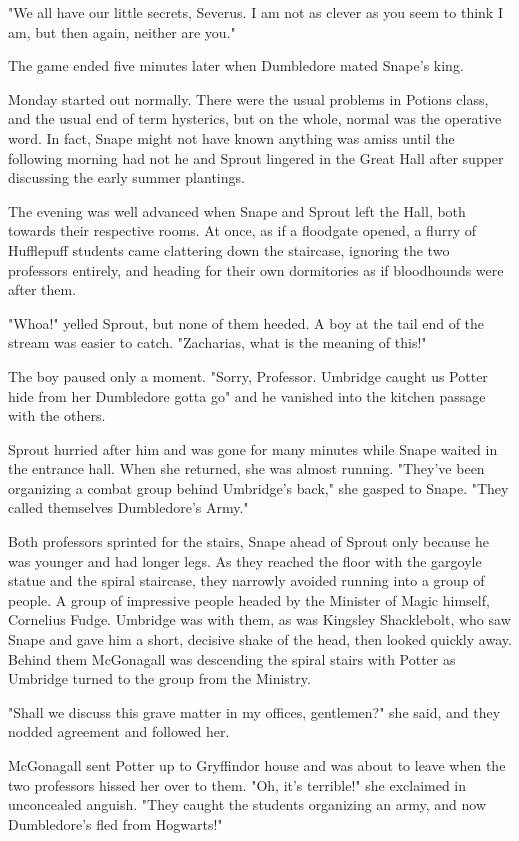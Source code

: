 "We all have our little secrets, Severus. I am not as clever as you seem to think I am, but then again, neither are you."

The game ended five minutes later when Dumbledore mated Snape's king.

Monday started out normally. There were the usual problems in Potions class, and the usual end of term hysterics, but on the whole, normal was the operative word. In fact, Snape might not have known anything was amiss until the following morning had not he and Sprout lingered in the Great Hall after supper discussing the early summer plantings.

The evening was well advanced when Snape and Sprout left the Hall, both towards their respective rooms. At once, as if a floodgate opened, a flurry of Hufflepuff students came clattering down the staircase, ignoring the two professors entirely, and heading for their own dormitories as if bloodhounds were after them.

"Whoa!" yelled Sprout, but none of them heeded. A boy at the tail end of the stream was easier to catch. "Zacharias, what is the meaning of this!"

The boy paused only a moment. "Sorry, Professor. Umbridge{\el} caught us{\el} Potter{\el} hide from her{\el} Dumbledore{\el} gotta go{\el}" and he vanished into the kitchen passage with the others.

Sprout hurried after him and was gone for many minutes while Snape waited in the entrance hall. When she returned, she was almost running. "They've been organizing a combat group behind Umbridge's back," she gasped to Snape. "They called themselves Dumbledore's Army."

Both professors sprinted for the stairs, Snape ahead of Sprout only because he was younger and had longer legs. As they reached the floor with the gargoyle statue and the spiral staircase, they narrowly avoided running into a group of people. A group of impressive people headed by the Minister of Magic himself, Cornelius Fudge. Umbridge was with them, as was Kingsley Shacklebolt, who saw Snape and gave him a short, decisive shake of the head, then looked quickly away. Behind them McGonagall was descending the spiral stairs with Potter as Umbridge turned to the group from the Ministry.

"Shall we discuss this grave matter in my offices, gentlemen?" she said, and they nodded agreement and followed her.

McGonagall sent Potter up to Gryffindor house and was about to leave when the two professors hissed her over to them. "Oh, it's terrible!" she exclaimed in unconcealed anguish. "They caught the students organizing an army, and now Dumbledore's fled from Hogwarts!"

